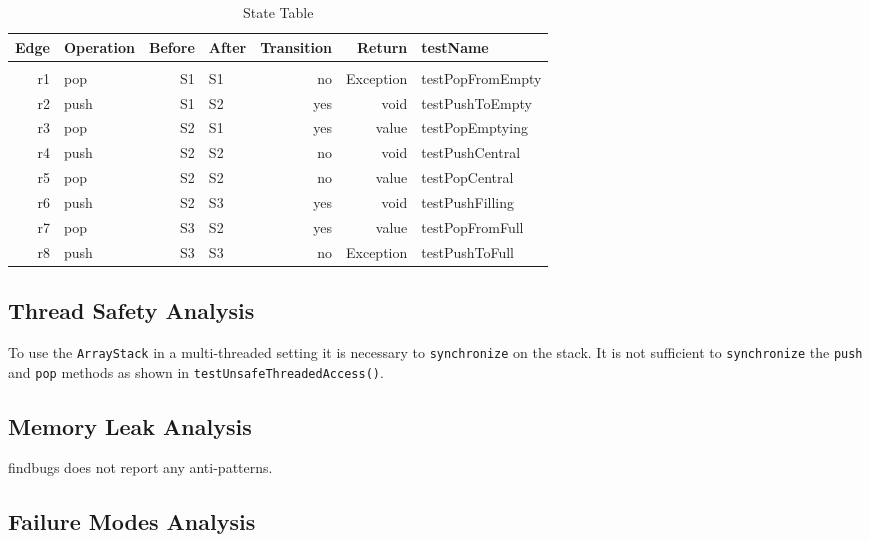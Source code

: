 \documentclass [12pt, a4paper, twoside, titlepage] {article}
\begin{document}
\begin{table}[!htbp]
\begin{tabular}{rlrlrrl}
\textbf{Edge} & \textbf{Operation} & \textbf{Before} & \textbf{After} & \textbf{Transition} & \textbf{Return} & \textbf{testName} \\ 
\hline\\
r1 & pop & S1 & S1 &  no & Exception & testPopFromEmpty \\

r2 & push & S1 & S2 & yes & void & testPushToEmpty\\

r3 & pop & S2 & S1 & yes & value & testPopEmptying\\

r4 & push & S2 & S2 & no & void & testPushCentral\\

r5 & pop & S2 & S2 & no & value & testPopCentral\\

r6 & push & S2 & S3 & yes & void & testPushFilling\\

r7 & pop & S3 & S2 & yes & value & testPopFromFull\\

r8 & push & S3 & S3 & no & Exception & testPushToFull\\  
\hline
\end{tabular}
\caption{State Table}
\label{tab:stateTable}
\end{table}
\FloatBarrier

\subsection{Thread Safety Analysis} 

To use the \texttt{ArrayStack} in a multi-threaded setting it is necessary to \texttt{synchronize} on the stack. 
It is not sufficient to \texttt{synchronize} the \texttt{push} and \texttt{pop} methods as shown in \texttt{testUnsafeThreadedAccess()}.


\subsection{Memory Leak Analysis}
findbugs does not report any anti-patterns.

\subsection{Failure Modes Analysis}
\end{document}
